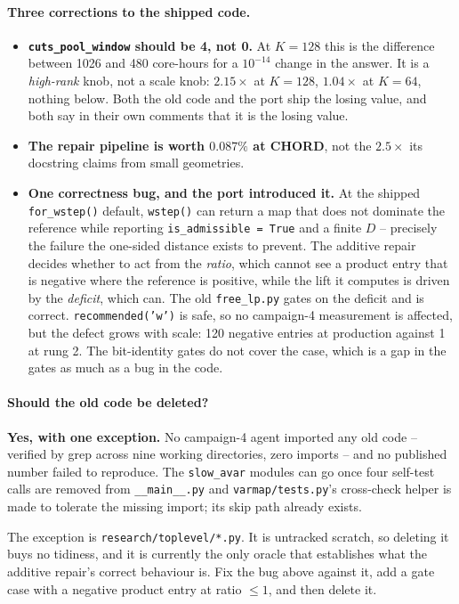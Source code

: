 \documentclass{article}
\numberwithin{equation}{section}   %
\begin{document}
\paragraph{Three corrections to the shipped code.}
\begin{itemize}
\item {\bf {\tt cuts\_pool\_window} should be 4, not 0.} At $K = 128$ this is the difference
  between 1026 and 480 core-hours for a $10^{-14}$ change in the answer. It is a {\em
  high-rank} knob, not a scale knob: $2.15\times$ at $K = 128$, $1.04\times$ at $K = 64$,
  nothing below. Both the old code and the port ship the losing value, and both say in their
  own comments that it is the losing value.
\item {\bf The repair pipeline is worth $0.087\%$ at CHORD}, not the $2.5\times$ its docstring
  claims from small geometries.
\item {\bf One correctness bug, and the port introduced it.} At the shipped {\tt for\_wstep()}
  default, {\tt wstep()} can return a map that does not dominate the reference while reporting
  {\tt is\_admissible = True} and a finite $D$ -- precisely the failure the one-sided distance
  exists to prevent. The additive repair decides whether to act from the {\em ratio}, which
  cannot see a product entry that is negative where the reference is positive, while the lift
  it computes is driven by the {\em deficit}, which can. The old {\tt free\_lp.py} gates on the
  deficit and is correct. {\tt recommended('w')} is safe, so no campaign-4 measurement is
  affected, but the defect grows with scale: 120 negative entries at production against 1 at
  rung 2. The bit-identity gates do not cover the case, which is a gap in the gates as much as
  a bug in the code.
\end{itemize}

\paragraph{Should the old code be deleted?}
{\bf Yes, with one exception.} No campaign-4 agent imported any old code -- verified by grep
across nine working directories, zero imports -- and no published number failed to reproduce.
The {\tt slow\_avar} modules can go once four self-test calls are removed from
{\tt \_\_main\_\_.py} and {\tt varmap/tests.py}'s cross-check helper is made to tolerate the
missing import; its skip path already exists.

The exception is {\tt research/toplevel/*.py}. It is untracked scratch, so deleting it buys no
tidiness, and it is currently the only oracle that establishes what the additive repair's
correct behaviour is. Fix the bug above against it, add a gate case with a negative product
entry at ratio $\le 1$, and then delete it.
\end{document}
